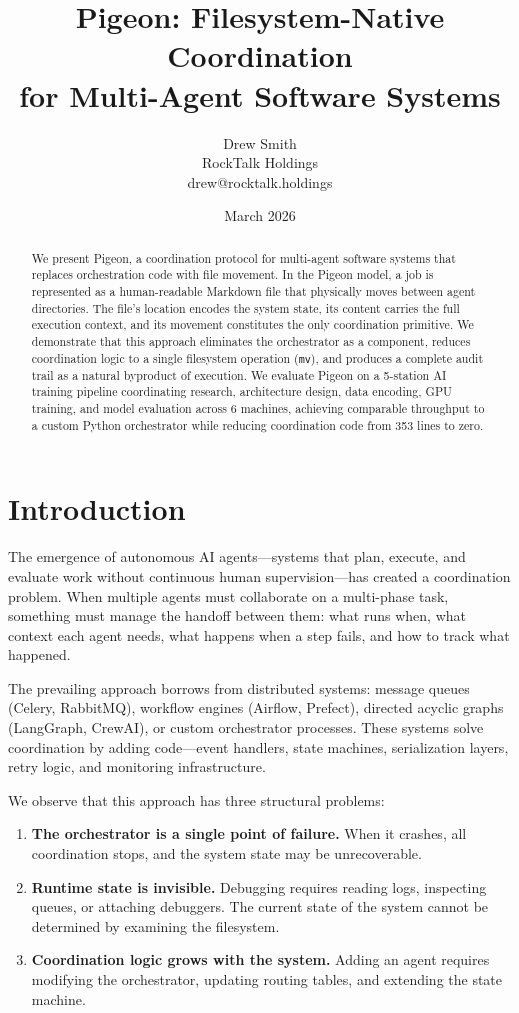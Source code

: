 \documentclass[11pt,a4paper]{article}
\title{\textbf{Pigeon: Filesystem-Native Coordination\\for Multi-Agent Software Systems}}
\author{Drew Smith\\RockTalk Holdings\\drew@rocktalk.holdings}
\date{March 2026}
\begin{document}
\maketitle

\begin{abstract}
We present Pigeon, a coordination protocol for multi-agent software systems that replaces orchestration code with file movement. In the Pigeon model, a job is represented as a human-readable Markdown file that physically moves between agent directories. The file's location encodes the system state, its content carries the full execution context, and its movement constitutes the only coordination primitive. We demonstrate that this approach eliminates the orchestrator as a component, reduces coordination logic to a single filesystem operation (\texttt{mv}), and produces a complete audit trail as a natural byproduct of execution. We evaluate Pigeon on a 5-station AI training pipeline coordinating research, architecture design, data encoding, GPU training, and model evaluation across 6 machines, achieving comparable throughput to a custom Python orchestrator while reducing coordination code from 353 lines to zero.
\end{abstract}

\section{Introduction}

The emergence of autonomous AI agents---systems that plan, execute, and evaluate work without continuous human supervision---has created a coordination problem. When multiple agents must collaborate on a multi-phase task, something must manage the handoff between them: what runs when, what context each agent needs, what happens when a step fails, and how to track what happened.

The prevailing approach borrows from distributed systems: message queues (Celery, RabbitMQ), workflow engines (Airflow, Prefect), directed acyclic graphs (LangGraph, CrewAI), or custom orchestrator processes. These systems solve coordination by adding code---event handlers, state machines, serialization layers, retry logic, and monitoring infrastructure.

We observe that this approach has three structural problems:

\begin{enumerate}
    \item \textbf{The orchestrator is a single point of failure.} When it crashes, all coordination stops, and the system state may be unrecoverable.
    \item \textbf{Runtime state is invisible.} Debugging requires reading logs, inspecting queues, or attaching debuggers. The current state of the system cannot be determined by examining the filesystem.
    \item \textbf{Coordination logic grows with the system.} Adding an agent requires modifying the orchestrator, updating routing tables, and extending the state machine.
\end{enumerate}
\end{document}
